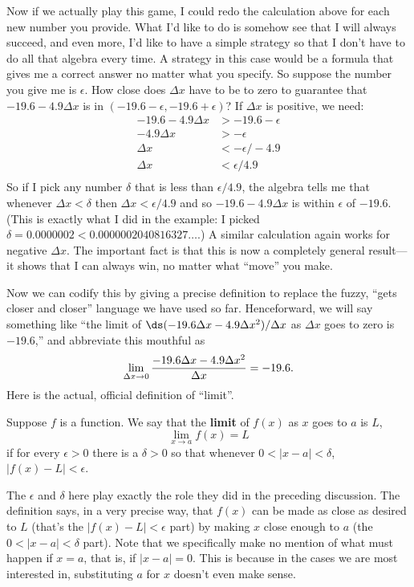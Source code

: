 Now if we actually play this game, I could redo the calculation above
for each new number you provide. What I'd like to do is somehow see
that I will always succeed, and even more, I'd like to have a simple
strategy so that I don't have to do all that algebra every time.
A strategy in this case would be a formula that gives me a correct
answer no matter what you specify. So suppose the number you give me
is $\epsilon$. How close does $\Delta x$ have to be to zero to
guarantee that $-19.6-4.9\Delta x$ is in $(-19.6-\epsilon,
-19.6+\epsilon)$? If $\Delta x$ is positive, we need:
\begin{align*}
-19.6-4.9\Delta x&> -19.6-\epsilon \\
-4.9\Delta x&>-\epsilon \\
\Delta x&<-\epsilon/-4.9 \\
\Delta x&<\epsilon/4.9 \\
\end{align*}
So if I pick any number $\delta$ that is less than $\epsilon/4.9$, the
algebra tells me that whenever $\Delta x<\delta$ then 
$\Delta x<\epsilon/4.9$ and so $-19.6-4.9\Delta x$ is within
$\epsilon$ of $-19.6$. (This is exactly what I did in the example:
I picked $\delta = 0.0000002 < 0.0000002040816327\ldots$.)
A similar calculation again works for negative
$\Delta x$.
The important fact is that this is now a completely general result---it
shows that I can always win, no matter what ``move'' you make.

Now we can codify this by giving a precise definition to replace the
fuzzy, ``gets closer and closer'' language we have used so
far. Henceforward, we will say something like ``the limit of
$\ds (-19.6\Delta x-4.9\Delta x^2)/\Delta x$ as $\Delta x$ goes to zero is
$-19.6$,'' and abbreviate this mouthful as
$$\lim_{\Delta x\to 0} {-19.6\Delta x-4.9\Delta x^2\over \Delta x}
= -19.6.
$$
Here is the actual, official definition of ``limit''.

\begin{definition}\label{def:limit} 
Suppose $f$ is a function. We say that the \textbf{limit} of $f(x)$ as
$x$ goes to $a$ is $L$,
\[
\lim_{x\to a}f(x)=L
\] 
if for every $\epsilon>0$ there is a $\delta > 0$ so that whenever $0
< |x-a| < \delta$, $|f(x)-L|<\epsilon$.
\end{definition}


The $\epsilon$ and $\delta$ here play exactly the role they did in the
preceding discussion. The definition says, in a very precise way, that
$f(x)$ can be made as close as desired to $L$ (that's the 
$|f(x)-L|<\epsilon$ part) by making $x$ close enough to $a$ (the 
$0 < |x-a| < \delta$ part). Note that we specifically make no mention
of what must happen if $x=a$, that is, if $|x-a|=0$. This is because
in the cases we are most interested in, substituting $a$ for $x$
doesn't even make sense.

